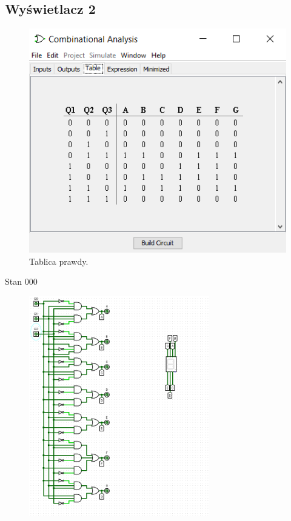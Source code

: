 \documentclass[]{article}
\begin{document}
\subsection{Wyświetlacz 2}
\begin{figure}[H]
	\centering
	\includegraphics[width=1\textwidth]{DWA_Tab.png}
	\caption{Tablica prawdy.}
\end{figure}
\newpage
Stan 000
\begin{figure}[H]
	\centering
	\includegraphics[width=0.7\textwidth]{DWA_000.png}
\end{figure}
\end{document}
